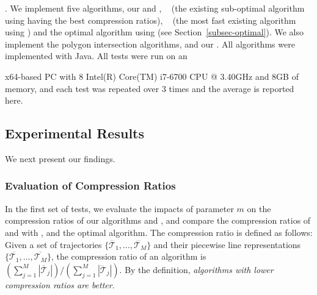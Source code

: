 .
We implement five \lsa algorithms, \ie our \cist and \cista, \dps~\cite{Meratnia:Spatiotemporal} (the existing sub-optimal \lsa algorithm using \sed having the best compression ratios), \squishe~\cite{Muckell:Compression} (the most fast existing \lsa algorithm using \sed) and the optimal \lsa algorithm using \sed (see Section~\ref{subsec-optimal}).
We also implement the polygon intersection algorithms, \cpia and our \rpia.
All algorithms were implemented with Java.
All tests were run on an {x64-based  PC with 8 Intel(R) Core(TM) i7-6700 CPU @ 3.40GHz and 8GB of memory, and each test was repeated
over 3 times and the average is reported here.

%

\subsection{Experimental Results}

We next present our findings.

\subsubsection{Evaluation of Compression Ratios}


In the first set of tests, we evaluate the impacts of parameter $m$ on the
compression ratios of our algorithms \cist and \cista, and compare the compression ratios of \cist and \cista with \dps, \squishe and the optimal algorithm.
%
The compression ratio is defined as follows: Given a set of trajectories $\{\dddot{\mathcal{T}_1}, \ldots, \dddot{\mathcal{T}_M}\}$ and their piecewise line representations $\{\overline{\mathcal{T}_1}, \ldots, \overline{\mathcal{T}_M}\}$, the compression ratio of an algorithm is $(\sum_{j=1}^{M} |\overline{\mathcal{T}}_j |)/(\sum_{j=1}^{M} |\dddot{\mathcal{T}}_j |)$.
By the definition, \emph{algorithms with lower compression ratios are better}.





}

